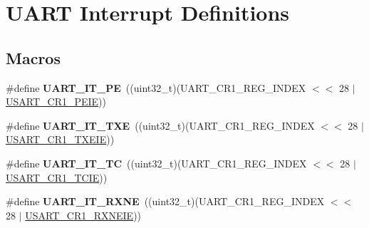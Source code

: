 \hypertarget{group___u_a_r_t___interrupt__definition}{\section{U\-A\-R\-T Interrupt Definitions}
\label{group___u_a_r_t___interrupt__definition}
}
\subsection*{Macros}
\begin{DoxyCompactItemize}
\item 
\hypertarget{group___u_a_r_t___interrupt__definition_ga55f922ddcf513509710ade5d7c40a1db}{\#define {\bfseries U\-A\-R\-T\-\_\-\-I\-T\-\_\-\-P\-E}~((uint32\-\_\-t)(U\-A\-R\-T\-\_\-\-C\-R1\-\_\-\-R\-E\-G\-\_\-\-I\-N\-D\-E\-X $<$$<$ 28 $\vert$ \hyperlink{group___peripheral___registers___bits___definition_ga27405d413b6d355ccdb076d52fef6875}{U\-S\-A\-R\-T\-\_\-\-C\-R1\-\_\-\-P\-E\-I\-E}))}\label{group___u_a_r_t___interrupt__definition_ga55f922ddcf513509710ade5d7c40a1db}

\item 
\hypertarget{group___u_a_r_t___interrupt__definition_ga552636e2af516d578856f5ee2ba71ed7}{\#define {\bfseries U\-A\-R\-T\-\_\-\-I\-T\-\_\-\-T\-X\-E}~((uint32\-\_\-t)(U\-A\-R\-T\-\_\-\-C\-R1\-\_\-\-R\-E\-G\-\_\-\-I\-N\-D\-E\-X $<$$<$ 28 $\vert$ \hyperlink{group___peripheral___registers___bits___definition_ga70422871d15f974b464365e7fe1877e9}{U\-S\-A\-R\-T\-\_\-\-C\-R1\-\_\-\-T\-X\-E\-I\-E}))}\label{group___u_a_r_t___interrupt__definition_ga552636e2af516d578856f5ee2ba71ed7}

\item 
\hypertarget{group___u_a_r_t___interrupt__definition_gab9a4dc4e8cea354fd60f4117513b2004}{\#define {\bfseries U\-A\-R\-T\-\_\-\-I\-T\-\_\-\-T\-C}~((uint32\-\_\-t)(U\-A\-R\-T\-\_\-\-C\-R1\-\_\-\-R\-E\-G\-\_\-\-I\-N\-D\-E\-X $<$$<$ 28 $\vert$ \hyperlink{group___peripheral___registers___bits___definition_gaa17130690a1ca95b972429eb64d4254e}{U\-S\-A\-R\-T\-\_\-\-C\-R1\-\_\-\-T\-C\-I\-E}))}\label{group___u_a_r_t___interrupt__definition_gab9a4dc4e8cea354fd60f4117513b2004}

\item 
\hypertarget{group___u_a_r_t___interrupt__definition_gac1bedf7a65eb8c3f3c4b52bdb24b139d}{\#define {\bfseries U\-A\-R\-T\-\_\-\-I\-T\-\_\-\-R\-X\-N\-E}~((uint32\-\_\-t)(U\-A\-R\-T\-\_\-\-C\-R1\-\_\-\-R\-E\-G\-\_\-\-I\-N\-D\-E\-X $<$$<$ 28 $\vert$ \hyperlink{group___peripheral___registers___bits___definition_ga91118f867adfdb2e805beea86666de04}{U\-S\-A\-R\-T\-\_\-\-C\-R1\-\_\-\-R\-X\-N\-E\-I\-E}))}\label{group___u_a_r_t___interrupt__definition_gac1bedf7a65eb8c3f3c4b52bdb24b139d}


\end{DoxyCompactItemize}
